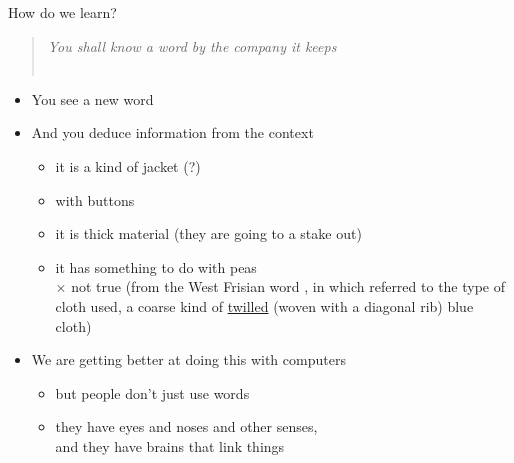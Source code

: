 \begin{frame}{How do we learn?}

\begin{quote}
  \textit{You shall know a word by the company it keeps} \hfill
 \\ ~ \hfill \citep[p11]{Firth:1957}
\end{quote}

\begin{itemize}
\item You see a new word 
\\ 
\item And you deduce information from the context

\begin{itemize}
\item[?] it is a kind of jacket \hfill(?)
\item[?] with buttons
\item [?] it is thick material (they are going to a stake out)
\item[?] it has something to do with peas \\ $\times$ not true (from the West
  Frisian word , in which  referred to the
  type of cloth used, a coarse kind of \ul{twilled} (woven with a diagonal rib) blue cloth)
\end{itemize}
\item We are getting better at doing this with computers
\begin{itemize}
\item but people don't just use words
\item they have eyes and noses and other senses, \\ and they have brains
  that link things
\end{itemize}

\end{itemize}

\end{frame}

